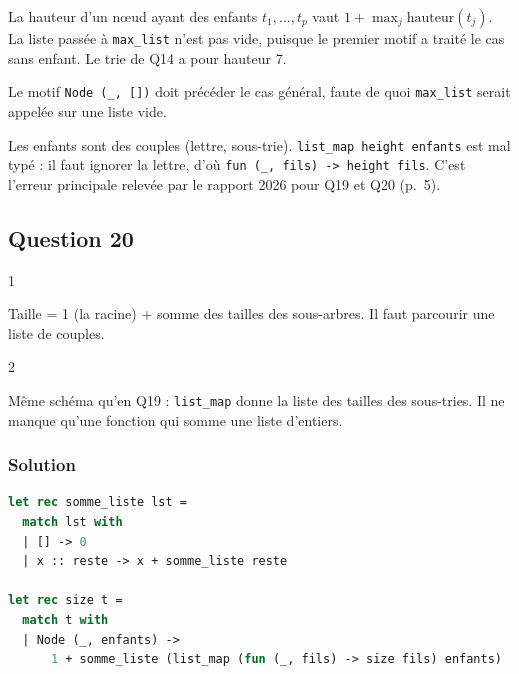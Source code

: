 \documentclass[11pt,a4paper]{article}
\begin{document}
La hauteur d'un nœud ayant des enfants \(t_1, \dots, t_p\) vaut \(1 + \max_j \mathrm{hauteur}(t_j)\). La liste passée à \texttt{max\_list} n'est pas vide, puisque le premier motif a traité le cas sans enfant. Le trie de Q14 a pour hauteur 7.

\begin{piege}

Le motif \texttt{Node\ (\_,\ {[}{]})} doit précéder le cas général, faute de quoi \texttt{max\_list} serait appelée sur une liste vide.

\end{piege}

\begin{piege}

Les enfants sont des couples (lettre, sous-trie). \texttt{list\_map\ height\ enfants} est mal typé : il faut ignorer la lettre, d'où \texttt{fun\ (\allowbreak{}\_,\allowbreak{}\ fils)\allowbreak{}\ -\textgreater{}\ height\ fils}. C'est l'erreur principale relevée par le rapport 2026 pour Q19 et Q20 (p.~5).

\end{piege}

\hypertarget{question-20}{%
\subsection{Question 20}\label{question-20}}

\begin{indication}{1}

Taille = 1 (la racine) + somme des tailles des sous-arbres. Il faut parcourir une liste de couples.

\end{indication}

\begin{indication}{2}

Même schéma qu'en Q19 : \texttt{list\_map} donne la liste des tailles des sous-tries. Il ne manque qu'une fonction qui somme une liste d'entiers.

\end{indication}

\hypertarget{solution-19}{%
\subsubsection{Solution}\label{solution-19}}

\begin{lstlisting}[language=Caml]
let rec somme_liste lst =
  match lst with
  | [] -> 0
  | x :: reste -> x + somme_liste reste

let rec size t =
  match t with
  | Node (_, enfants) ->
      1 + somme_liste (list_map (fun (_, fils) -> size fils) enfants)
\end{lstlisting}
\end{document}
